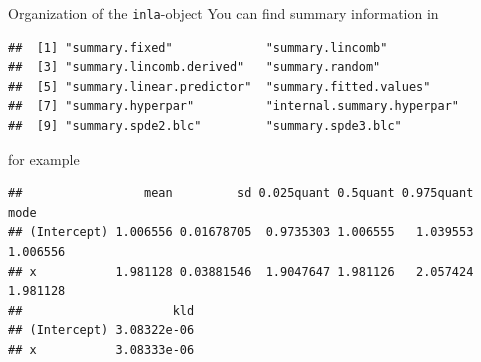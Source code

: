 \documentclass[
  ignorenonframetext,
]{beamer}
\newenvironment{Shaded}{\begin{snugshade}}{\end{snugshade}}
\newcommand{\NormalTok}[1]{#1}
\newcommand{\SpecialCharTok}[1]{\textcolor[rgb]{0.00,0.00,0.00}{#1}}
\begin{document}
\begin{frame}[fragile]{Organization of the \texttt{inla}-object}
\protect\hypertarget{organization-of-the-inla-object-1}{}
You can find summary information in \small

\begin{verbatim}
##  [1] "summary.fixed"             "summary.lincomb"          
##  [3] "summary.lincomb.derived"   "summary.random"           
##  [5] "summary.linear.predictor"  "summary.fitted.values"    
##  [7] "summary.hyperpar"          "internal.summary.hyperpar"
##  [9] "summary.spde2.blc"         "summary.spde3.blc"
\end{verbatim}

\normalsize

for example

\scriptsize

\begin{Shaded}
\end{Shaded}

\begin{verbatim}
##                 mean         sd 0.025quant 0.5quant 0.975quant     mode
## (Intercept) 1.006556 0.01678705  0.9735303 1.006555   1.039553 1.006556
## x           1.981128 0.03881546  1.9047647 1.981126   2.057424 1.981128
##                     kld
## (Intercept) 3.08322e-06
## x           3.08333e-06
\end{verbatim}

\normalsize
\end{frame}
\end{document}
